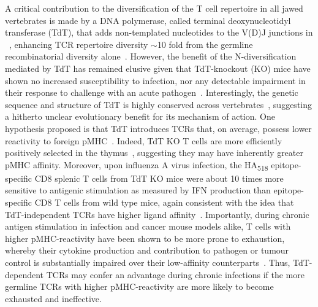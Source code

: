 A critical contribution to the diversification of the T cell repertoire in all jawed vertebrates is made by a DNA polymerase, called terminal deoxynucleotidyl transferase (TdT), that adds non-templated nucleotides to the V(D)J junctions in \textalpha{}~\cite{schatz2011recombination,gilfillan1995mice,cabaniols2001most,litman2010origins}, enhancing TCR repertoire diversity $\sim$10 fold from the germline recombinatorial diversity alone~\cite{davis1988t,murugan2012statistical,zarnitsyna2013estimating}. However, the benefit of the N-diversification mediated by TdT has remained elusive given that TdT-knockout (KO) mice have shown no increased susceptibility to infection, nor any detectable impairment in their response to challenge with an acute pathogen~\cite{gilfillan1995efficient,gilfillan1995mice}. Interestingly, the genetic sequence and structure of TdT is highly conserved across vertebrates~\cite{lee1994isolation,hansen1997characterization}, suggesting a hitherto unclear evolutionary benefit for its mechanism of action. One hypothesis proposed is that TdT introduces TCRs that, on average, possess lower reactivity to foreign pMHC~\cite{vrisekoop2014revisiting}. Indeed, TdT KO T cells are more efficiently positively selected in the thymus~\cite{gilfillan1994more}, suggesting they may have inherently greater pMHC affinity. Moreover, upon influenza A virus infection, the HA\textsubscript{518} epitope-specific CD8\pos{} splenic T cells from TdT KO mice were about 10 times more sensitive to antigenic stimulation as measured by IFN\textgamma{} production than epitope-specific CD8\pos{} T cells from wild type mice, again consistent with the idea that TdT-independent TCRs have higher ligand affinity~\cite{haeryfar2008terminal}. Importantly, during chronic antigen stimulation in infection and cancer mouse models alike, T cells with higher pMHC-reactivity have been shown to be more prone to exhaustion, whereby their cytokine production and contribution to pathogen or tumour control is substantially impaired over their low-affinity counterparts~\cite{wherry2003viral,alexander1996role,shakiba2021tcr}. Thus, TdT-dependent TCRs may confer an advantage during chronic infections if the more germline TCRs with higher pMHC-reactivity are more likely to become exhausted and ineffective.

